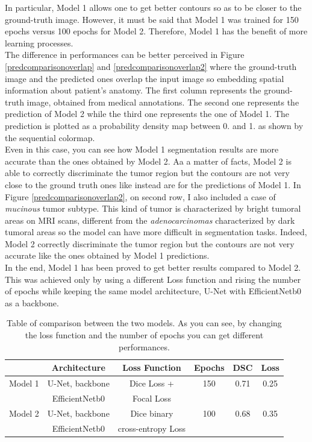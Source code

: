\documentclass{standalone}
\begin{document}
In particular, Model 1 allows one to get better contours so as to be closer to the ground-truth image.
However, it must be said that Model 1 was trained for 150 epochs versus 100 epochs for Model 2.
Therefore, Model 1 has the benefit of more learning processes.
\\
The difference in performances can be better perceived in Figure \ref{predcomparisonoverlap} and \ref{predcomparisonoverlap2} where the ground-truth image and the predicted ones overlap the input image so embedding spatial information about patient's anatomy.
The first column represents the ground-truth image, obtained from medical annotations. 
The second one represents the prediction of Model 2 while the third one represents the one of Model 1.
The prediction is plotted as a probability density map between 0. and 1. as shown by the sequential colormap.
\\
Even in this case, you can see how Model 1 segmentation results are more accurate than the ones obtained by Model 2.
Aa a matter of facts, Model 2 is able to correctly discriminate the tumor region but the contours are not very close to the ground truth ones like instead are for the predictions of Model 1.
In Figure \ref{predcomparisonoverlap2}, on second row, I also included a case of \textit{mucinous} tumor subtype.
This kind of tumor is characterized by bright tumoral areas on MRI scans, different from the \textit{adenocarcinomas} characterized by dark tumoral areas so the model can have more difficult in segmentation tasks.
Indeed, Model 2 correctly discriminate the tumor region but the contours are not very accurate like the ones obtained by Model 1 predictions.
\\
In the end, Model 1 has been proved to get better results compared to Model 2.
This was achieved only by using a different Loss function and rising the number of epochs while keeping the same model architecture, U-Net with EfficientNetb0 as a backbone.

\vfill

\begin{table}[htp]
	\centering
	\begin{tabular}{lccccc}
		\toprule
		  & \textbf{Architecture} & \textbf{Loss Function} & \textbf{Epochs} & \textbf{DSC} & \textbf{Loss} \\
	    \midrule
		Model 1  & U-Net, backbone & Dice Loss +   &  150 &  0.71 & 0.25\\
                & EfficientNetb0 &    Focal Loss              &      &   &   \\
         \midrule
		Model 2  & U-Net, backbone  & Dice binary  & 100 &  0.68 & 0.35 \\
        & EfficientNetb0 &   cross-entropy Loss               &      &   &   \\

		\bottomrule
	\end{tabular}
	\caption{Table of comparison between the two models. As you can see, by changing the loss function and the number of epochs you can get different performances.}
	\label{tab:comparison}
\end{table}
\end{document}
